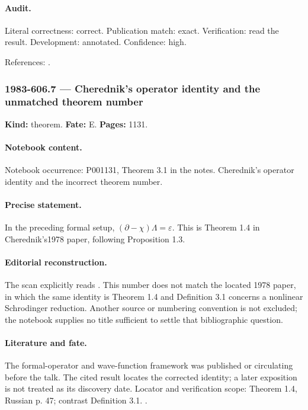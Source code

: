 \paragraph{Audit.} Literal correctness: correct. Publication match: exact. Verification: read the result. Development: annotated. Confidence: high.

\noindent References: \citep{cherednik1978differential}.\par

\subsubsection{1983-606.7 --- Cherednik's operator identity and the unmatched theorem number}

\label{item:1983-606.7}

\noindent\textbf{Kind:} theorem. \textbf{Fate:} E. \textbf{Pages:} 1131.\par

\paragraph{Notebook content.} Notebook occurrence: P001131, Theorem 3.1 in the notes. Cherednik's operator identity and the incorrect theorem number.

\paragraph{Precise statement.} In the preceding formal setup, \((\partial-\chi)\Lambda=\varepsilon\). This is Theorem 1.4 in Cherednik's1978 paper, following Proposition 1.3.

\paragraph{Editorial reconstruction.} The scan explicitly reads . This number does not match the located 1978 paper, in which the same identity is Theorem 1.4 and Definition 3.1 concerns a nonlinear Schrodinger reduction. Another source or numbering convention is not excluded; the notebook supplies no title sufficient to settle that bibliographic question.

\paragraph{Literature and fate.} The formal-operator and wave-function framework was published or circulating before the talk. The cited result locates the corrected identity; a later exposition is not treated as its discovery date. Locator and verification scope: Theorem 1.4, Russian p. 47; contrast Definition 3.1. \cite{cherednik1978differential}.

